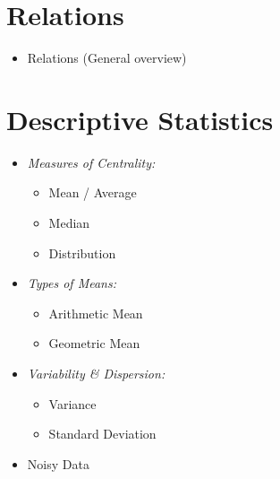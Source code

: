 \documentclass[11pt]{article}
\begin{document}
\section{Relations}
\begin{itemize}
\item Relations (General overview)
\end{itemize}
\nopagebreak
\section{Descriptive Statistics}
\begin{itemize}
\item \emph{Measures of Centrality:}
\begin{itemize}
\item Mean / Average
\item Median
\item Distribution
\end{itemize}
\item \emph{Types of Means:}
\begin{itemize}
\item Arithmetic Mean
\item Geometric Mean
\end{itemize}
\item \emph{Variability \& Dispersion:}
\begin{itemize}
\item Variance
\item Standard Deviation
\end{itemize}
\item Noisy Data
\end{itemize} 
\end{document}
